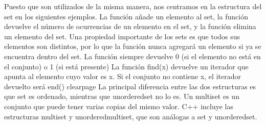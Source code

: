 {}Puesto que son utilizados de la misma manera, nos centramos en la estructura del set en los siguientes ejemplos.\markdownRendererParagraphSeparator
{}La función  añade un elemento al set, la función  devuelve el número de ocurrencias de un elemento en el set, y la función  elimina un elemento del set.\markdownRendererInterblockSeparator
{}\markdownRendererInterblockSeparator
{}Una propiedad importante de los sets es que todos sus elementos son distintos, por lo que la función  nunca agregará un elemento si ya se encuentra dentro del set.\markdownRendererParagraphSeparator
{}La función  siempre devuelve 0 (si el elemento no está en el conjunto) o 1 (si está presente)\markdownRendererInterblockSeparator
{}\markdownRendererInterblockSeparator
{}\markdownRendererInterblockSeparator
{}La función find(x) devuelve un iterador que apunta al elemento cuyo valor es x. Si el conjunto no contiene x, el iterador devuelto será end()\markdownRendererInterblockSeparator
{}\markdownRendererInterblockSeparator
{}\markdownRendererDollarSign{}\markdownRendererBackslash{}clearpage\markdownRendererDollarSign{}\markdownRendererInterblockSeparator
{}
\markdownRendererSectionEnd \markdownRendererSectionBegin
{}\markdownRendererInterblockSeparator
{}La principal diferencia entre las dos estructuras es que set es ordenado, mientras que unordered\markdownRendererUnderscore{}set no lo es.\markdownRendererInterblockSeparator
{}\markdownRendererInterblockSeparator
{}\markdownRendererInterblockSeparator
{}
\markdownRendererSectionEnd \markdownRendererSectionBegin
{}\markdownRendererInterblockSeparator
{}Un multiset es un conjunto que puede tener varias copias del mismo valor.\markdownRendererSoftLineBreak
{}C++ incluye las estructuras multiset y unordered\markdownRendererUnderscore{}multiset, que son análogas a set y unordered\markdownRendererUnderscore{}set.\markdownRendererParagraphSeparator
